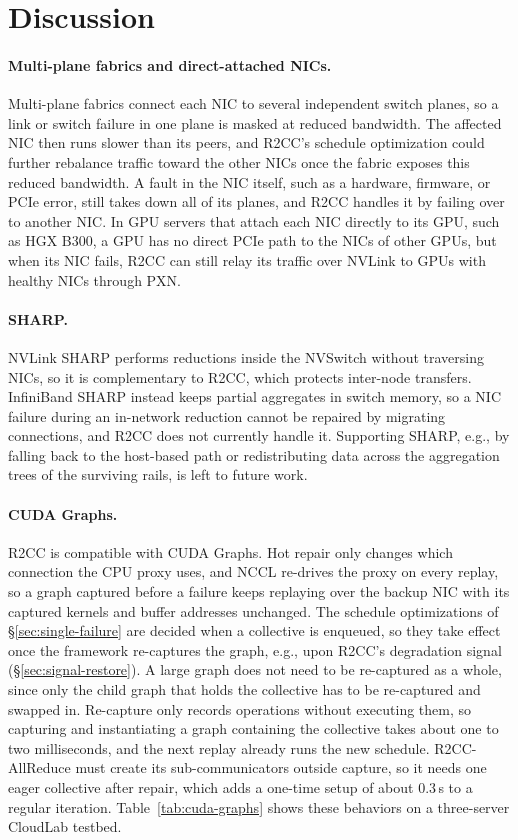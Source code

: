 \section{Discussion}\label{app:discussion}
\paragraph{Multi-plane fabrics and direct-attached NICs.} Multi-plane fabrics connect each NIC to several independent switch planes, so a link or switch failure in one plane is masked at reduced bandwidth. The affected NIC then runs slower than its peers, and R2CC's schedule optimization could further rebalance traffic toward the other NICs once the fabric exposes this reduced bandwidth. A fault in the NIC itself, such as a hardware, firmware, or PCIe error, still takes down all of its planes, and R2CC handles it by failing over to another NIC. In GPU servers that attach each NIC directly to its GPU, such as HGX B300, a GPU has no direct PCIe path to the NICs of other GPUs, but when its NIC fails, R2CC can still relay its traffic over NVLink to GPUs with healthy NICs through PXN.

\paragraph{SHARP.} NVLink SHARP performs reductions inside the NVSwitch without traversing NICs, so it is complementary to R2CC, which protects inter-node transfers. InfiniBand SHARP instead keeps partial aggregates in switch memory, so a NIC failure during an in-network reduction cannot be repaired by migrating connections, and R2CC does not currently handle it. Supporting SHARP, e.g., by falling back to the host-based path or redistributing data across the aggregation trees of the surviving rails, is left to future work.

\paragraph{CUDA Graphs.} R2CC is compatible with CUDA Graphs. Hot repair only changes which connection the CPU proxy uses, and NCCL re-drives the proxy on every replay, so a graph captured before a failure keeps replaying over the backup NIC with its captured kernels and buffer addresses unchanged. The schedule optimizations of \S\ref{sec:single-failure} are decided when a collective is enqueued, so they take effect once the framework re-captures the graph, e.g., upon R2CC's degradation signal (\S\ref{sec:signal-restore}). A large graph does not need to be re-captured as a whole, since only the child graph that holds the collective has to be re-captured and swapped in. Re-capture only records operations without executing them, so capturing and instantiating a graph containing the collective takes about one to two milliseconds, and the next replay already runs the new schedule. R2CC-AllReduce must create its sub-communicators outside capture, so it needs one eager collective after repair, which adds a one-time setup of about 0.3\,s to a regular iteration. Table~\ref{tab:cuda-graphs} shows these behaviors on a three-server CloudLab testbed.

